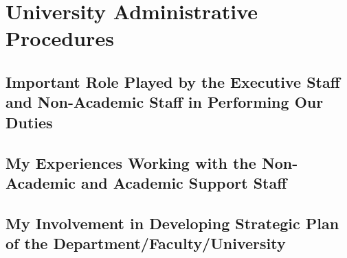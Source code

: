 \chapter{University Administrative Procedures}
\section{Important Role Played by the Executive Staff and Non-Academic Staff in Performing Our Duties}
\section{My Experiences Working with the Non-Academic and Academic Support Staff}
\section{My Involvement in Developing Strategic Plan of the Department/Faculty/University}